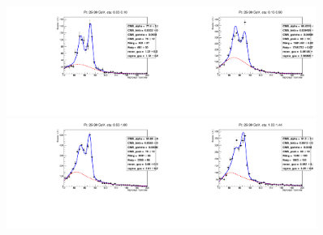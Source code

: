 \begin{figure}[htb]
  \begin{center}
   \includegraphics[width=0.45\textwidth]{../figs/figs_v11/ELECTRON_WGamma/EtoGammaFits/sa_hZmass_h_Data_EtoGamma_Enr_BARREL_pt25to30_ieta0.pdf}\includegraphics[width=0.45\textwidth]{../figs/figs_v11/ELECTRON_WGamma/EtoGammaFits/sa_hZmass_h_Data_EtoGamma_Enr_BARREL_pt25to30_ieta1.pdf}\\
   \includegraphics[width=0.45\textwidth]{../figs/figs_v11/ELECTRON_WGamma/EtoGammaFits/sa_hZmass_h_Data_EtoGamma_Enr_BARREL_pt25to30_ieta2.pdf}\includegraphics[width=0.45\textwidth]{../figs/figs_v11/ELECTRON_WGamma/EtoGammaFits/sa_hZmass_h_Data_EtoGamma_Enr_BARREL_pt25to30_ieta3.pdf}\\

\end{center}
\end{figure}
